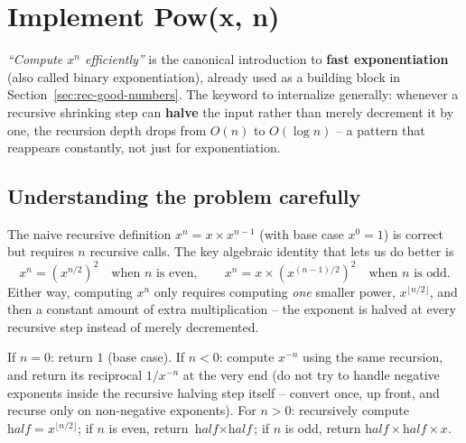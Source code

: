 \section{Implement Pow(x, n)}
\label{sec:rec-pow}


\begin{patternbox}
\emph{``Compute $x^n$ efficiently''} is the canonical introduction to
\textbf{fast exponentiation} (also called binary exponentiation), already
used as a building block in Section~\ref{sec:rec-good-numbers}. The
keyword to internalize generally: whenever a recursive shrinking step can
\textbf{halve} the input rather than merely decrement it by one, the
recursion depth drops from $O(n)$ to $O(\log n)$ -- a pattern that
reappears constantly, not just for exponentiation.
\end{patternbox}

\subsection*{Understanding the problem carefully}

The naive recursive definition $x^n = x \times x^{n-1}$ (with base case
$x^0=1$) is correct but requires $n$ recursive calls. The key
algebraic identity that lets us do better is
\[
  x^n = \left(x^{n/2}\right)^2 \quad \text{when } n \text{ is even}, \qquad
  x^n = x \times \left(x^{(n-1)/2}\right)^2 \quad \text{when } n \text{ is
  odd}.
\]
Either way, computing $x^n$ only requires computing \emph{one} smaller
power, $x^{\lfloor n/2 \rfloor}$, and then a constant amount of extra
multiplication -- the exponent is halved at every recursive step instead
of merely decremented.

\begin{ideabox}
If $n=0$: return $1$ (base case). If $n<0$: compute $x^{-n}$ using the
same recursion, and return its reciprocal $1/x^{-n}$ at the very end (do
not try to handle negative exponents inside the recursive halving step
itself -- convert once, up front, and recurse only on non-negative
exponents). For $n>0$: recursively compute $\textit{half} =
x^{\lfloor n/2 \rfloor}$; if $n$ is even, return $\textit{half} \times
\textit{half}$; if $n$ is odd, return $\textit{half} \times \textit{half}
\times x$.
\end{ideabox}

